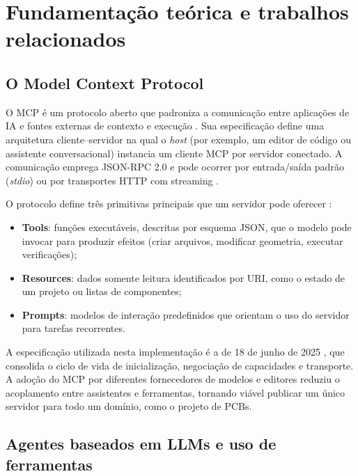 \section{Fundamentação teórica e trabalhos relacionados}\label{sec:fundamentacao}

\subsection{O Model Context Protocol}

O MCP é um protocolo aberto que padroniza a comunicação entre aplicações de IA
e fontes externas de contexto e execução \citep{anthropic2024mcp}. Sua
especificação define uma arquitetura cliente--servidor na qual o
\emph{host} (por exemplo, um editor de código ou assistente conversacional)
instancia um cliente MCP por servidor conectado. A comunicação emprega
JSON-RPC 2.0 e pode ocorrer por entrada/saída padrão (\emph{stdio}) ou por
transportes HTTP com streaming \citep{mcp2025spec}.

O protocolo define três primitivas principais que um servidor pode oferecer
\citep{mcp2025docs}:

\begin{itemize}[leftmargin=1.4em,itemsep=0.2em]
  \item \textbf{Tools}: funções executáveis, descritas por esquema JSON, que o
        modelo pode invocar para produzir efeitos (criar arquivos, modificar
        geometria, executar verificações);
  \item \textbf{Resources}: dados somente leitura identificados por URI, como o
        estado de um projeto ou listas de componentes;
  \item \textbf{Prompts}: modelos de interação predefinidos que orientam o
        uso do servidor para tarefas recorrentes.
\end{itemize}

A especificação utilizada nesta implementação é a de 18 de junho de 2025
\citep{mcp2025spec}, que consolida o ciclo de vida de inicialização,
negociação de capacidades e transporte. A adoção do MCP por diferentes
fornecedores de modelos e editores reduziu o acoplamento entre assistentes e
ferramentas, tornando viável publicar um único servidor para todo um domínio,
como o projeto de PCBs.

\subsection{Agentes baseados em LLMs e uso de ferramentas}


